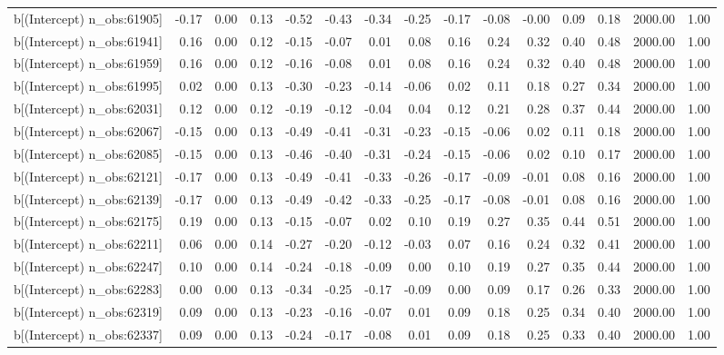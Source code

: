 \begin{table}[ht]
\begin{tabular}{rrrrrrrrrrrrrrr}
  b[(Intercept) n\_obs:61905] & -0.17 & 0.00 & 0.13 & -0.52 & -0.43 & -0.34 & -0.25 & -0.17 & -0.08 & -0.00 & 0.09 & 0.18 & 2000.00 & 1.00 \\ 
  b[(Intercept) n\_obs:61941] & 0.16 & 0.00 & 0.12 & -0.15 & -0.07 & 0.01 & 0.08 & 0.16 & 0.24 & 0.32 & 0.40 & 0.48 & 2000.00 & 1.00 \\ 
  b[(Intercept) n\_obs:61959] & 0.16 & 0.00 & 0.12 & -0.16 & -0.08 & 0.01 & 0.08 & 0.16 & 0.24 & 0.32 & 0.40 & 0.48 & 2000.00 & 1.00 \\ 
  b[(Intercept) n\_obs:61995] & 0.02 & 0.00 & 0.13 & -0.30 & -0.23 & -0.14 & -0.06 & 0.02 & 0.11 & 0.18 & 0.27 & 0.34 & 2000.00 & 1.00 \\ 
  b[(Intercept) n\_obs:62031] & 0.12 & 0.00 & 0.12 & -0.19 & -0.12 & -0.04 & 0.04 & 0.12 & 0.21 & 0.28 & 0.37 & 0.44 & 2000.00 & 1.00 \\ 
  b[(Intercept) n\_obs:62067] & -0.15 & 0.00 & 0.13 & -0.49 & -0.41 & -0.31 & -0.23 & -0.15 & -0.06 & 0.02 & 0.11 & 0.18 & 2000.00 & 1.00 \\ 
  b[(Intercept) n\_obs:62085] & -0.15 & 0.00 & 0.13 & -0.46 & -0.40 & -0.31 & -0.24 & -0.15 & -0.06 & 0.02 & 0.10 & 0.17 & 2000.00 & 1.00 \\ 
  b[(Intercept) n\_obs:62121] & -0.17 & 0.00 & 0.13 & -0.49 & -0.41 & -0.33 & -0.26 & -0.17 & -0.09 & -0.01 & 0.08 & 0.16 & 2000.00 & 1.00 \\ 
  b[(Intercept) n\_obs:62139] & -0.17 & 0.00 & 0.13 & -0.49 & -0.42 & -0.33 & -0.25 & -0.17 & -0.08 & -0.01 & 0.08 & 0.16 & 2000.00 & 1.00 \\ 
  b[(Intercept) n\_obs:62175] & 0.19 & 0.00 & 0.13 & -0.15 & -0.07 & 0.02 & 0.10 & 0.19 & 0.27 & 0.35 & 0.44 & 0.51 & 2000.00 & 1.00 \\ 
  b[(Intercept) n\_obs:62211] & 0.06 & 0.00 & 0.14 & -0.27 & -0.20 & -0.12 & -0.03 & 0.07 & 0.16 & 0.24 & 0.32 & 0.41 & 2000.00 & 1.00 \\ 
  b[(Intercept) n\_obs:62247] & 0.10 & 0.00 & 0.14 & -0.24 & -0.18 & -0.09 & 0.00 & 0.10 & 0.19 & 0.27 & 0.35 & 0.44 & 2000.00 & 1.00 \\ 
  b[(Intercept) n\_obs:62283] & 0.00 & 0.00 & 0.13 & -0.34 & -0.25 & -0.17 & -0.09 & 0.00 & 0.09 & 0.17 & 0.26 & 0.33 & 2000.00 & 1.00 \\ 
  b[(Intercept) n\_obs:62319] & 0.09 & 0.00 & 0.13 & -0.23 & -0.16 & -0.07 & 0.01 & 0.09 & 0.18 & 0.25 & 0.34 & 0.40 & 2000.00 & 1.00 \\ 
  b[(Intercept) n\_obs:62337] & 0.09 & 0.00 & 0.13 & -0.24 & -0.17 & -0.08 & 0.01 & 0.09 & 0.18 & 0.25 & 0.33 & 0.40 & 2000.00 & 1.00 \\ 

\end{tabular}
\end{table}
